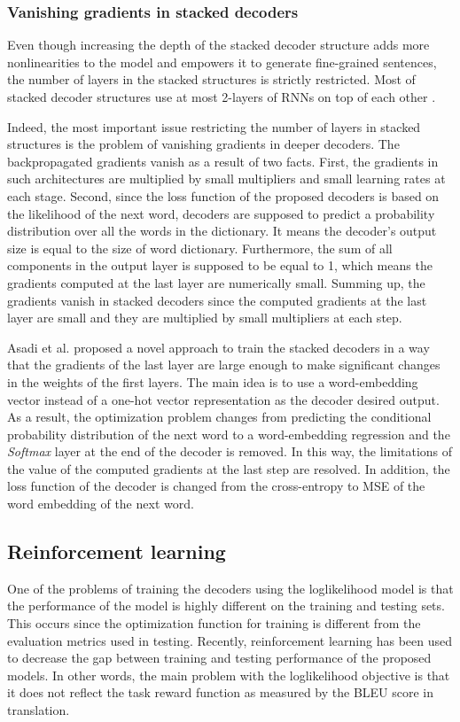 \documentclass[preprint, 10pt]{elsarticle}
\begin{document}
		\subsubsection{Vanishing gradients in stacked decoders}
		Even though increasing the depth of the stacked decoder structure adds more nonlinearities to the model and empowers it to generate fine-grained sentences, the number of layers in the stacked structures is strictly restricted. Most of stacked decoder structures use at most 2-layers of RNNs on top of each other \cite{donahue2015long} \cite{pan2016hierarchical} \cite{yu2016video}. 
		
		Indeed, the most important issue restricting the number of layers in stacked structures is the problem of vanishing gradients in deeper decoders. The backpropagated gradients vanish as a result of two facts. First, the gradients in such architectures are multiplied by small multipliers and small learning rates at each stage. Second, since the loss function of the proposed decoders is based on the likelihood of the next word, decoders are supposed to predict a probability distribution over all the words in the dictionary. It means the decoder's output size is equal to the size of word dictionary. Furthermore, the sum of all components in the output layer is supposed to be equal to 1, which means the gradients computed at the last layer are numerically small. Summing up, the gradients vanish in stacked decoders since the computed gradients at the last layer are small and they are multiplied by small multipliers at each step.
		
		Asadi et al. \cite{Asadi2019stacked} proposed a novel approach to train the stacked decoders in a way that the gradients of the last layer are large enough to make significant changes in the weights of the first layers. The main idea is to use a word-embedding vector instead of a one-hot vector representation as the decoder desired output. As a result, the optimization problem changes from predicting the conditional probability distribution of the next word to a word-embedding regression and the \textit{Softmax} layer at the end of the decoder is removed. In this way, the limitations of the value of the computed gradients at the last step are resolved. In addition, the loss function of the decoder is changed from the cross-entropy to MSE of the word embedding of the next word.
		
		\subsection{Reinforcement learning}
		One of the problems of training the decoders using the loglikelihood model is that the performance of the model is highly different on the training and testing sets. This occurs since the optimization function for training is different from the evaluation metrics used in testing. Recently, reinforcement learning has been used to decrease the gap between training and testing performance of the proposed models. In other words, the main problem with the loglikelihood objective is that it does not reflect the task reward function as measured by the BLEU score in translation. 
		
\end{document}
